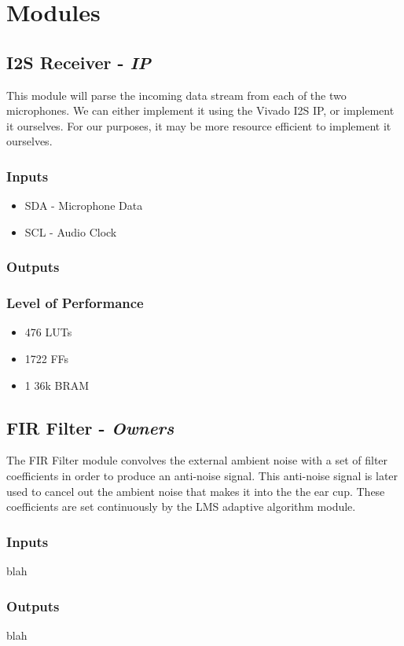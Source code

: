 \documentclass[12pt]{fpgairpods}
\begin{document}
\section{Modules}
\begin{multicols}{2}
\subsection{I2S Receiver - \textit{IP}}
This module will parse the incoming data stream from each of the two microphones. We can either implement it using the Vivado I2S IP, or implement it ourselves. For our purposes, it may be more resource efficient to implement it ourselves.
\subsubsection{Inputs}
\begin{itemize}
    \item SDA - Microphone Data
    \item SCL - Audio Clock
\end{itemize}
\subsubsection{Outputs}
\subsubsection{Level of Performance}
\begin{itemize}
    \item 476 LUTs
    \item 1722 FFs
    \item 1 36k BRAM
\end{itemize}

\subsection{FIR Filter - \textit{Owners}}
The FIR Filter module convolves the external ambient noise with a set of filter coefficients in order to produce an anti-noise signal. This anti-noise signal is later used to cancel out the ambient noise that makes it into the the ear cup. These coefficients are set continuously by the LMS adaptive algorithm module.
\subsubsection{Inputs}
blah
\subsubsection{Outputs}
blah

\end{multicols}
\end{document}
